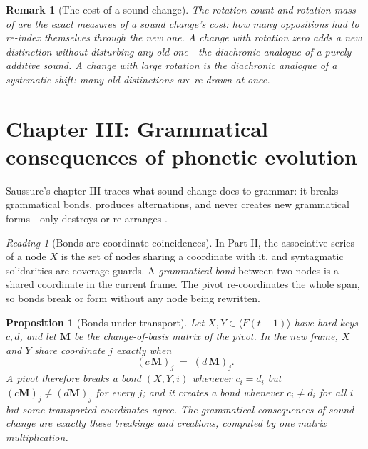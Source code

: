 \documentclass[11pt,a4paper]{article}
\newtheorem{proposition}[principle]{Proposition}
\newtheorem{remark}[principle]{Remark}
\theoremstyle{remark}
\newtheorem{reading}[principle]{Reading}
\newcommand{\spanof}[1]{\ensuremath{\langle #1\rangle}}  %
\newcommand{\Change}{\ensuremath{\mathbf{M}}}            %
\begin{document}
\begin{remark}[The cost of a sound change]
The rotation count and rotation mass of \cite{state2026} are the exact
measures of a sound change's cost: how many oppositions had to re-index
themselves through the new one. A change with rotation zero adds a new
distinction without disturbing any old one---the diachronic analogue of a
purely additive sound. A change with large rotation is the diachronic
analogue of a systematic shift: many old distinctions are re-drawn at once.
\end{remark}

\section{Chapter III: Grammatical consequences of phonetic evolution}
\label{sec:ch3}

Saussure's chapter III traces what sound change does to grammar: it breaks
grammatical bonds, produces alternations, and never creates new grammatical
forms---only destroys or re-arranges \cite[Part III, ch.~III]{harris1983}.

\begin{reading}[Bonds are coordinate coincidences]
\label{read:bonds}
In Part II, the associative series of a node $X$ is the set of nodes sharing
a coordinate with it, and syntagmatic solidarities are coverage guards. A
\emph{grammatical bond} between two nodes is a shared coordinate in the
current frame. The pivot re-coordinates the whole span, so bonds break or
form without any node being rewritten.
\end{reading}

\begin{proposition}[Bonds under transport]
\label{prop:bonds}
Let $X, Y \in \spanof{F(t{-}1)}$ have hard keys $c, d$, and let $\Change$ be
the change-of-basis matrix of the pivot. In the new frame, $X$ and $Y$ share
coordinate $j$ exactly when
\[
  (c \,\Change)_j \;=\; (d \,\Change)_j .
\]
A pivot therefore breaks a bond $(X,Y,i)$ whenever $c_i = d_i$ but
$(c\Change)_j \neq (d\Change)_j$ for every $j$; and it creates a bond
whenever $c_i \neq d_i$ for all $i$ but some transported coordinates agree.
The grammatical consequences of sound change are exactly these breakings and
creations, computed by one matrix multiplication.
\end{proposition}
\end{document}
